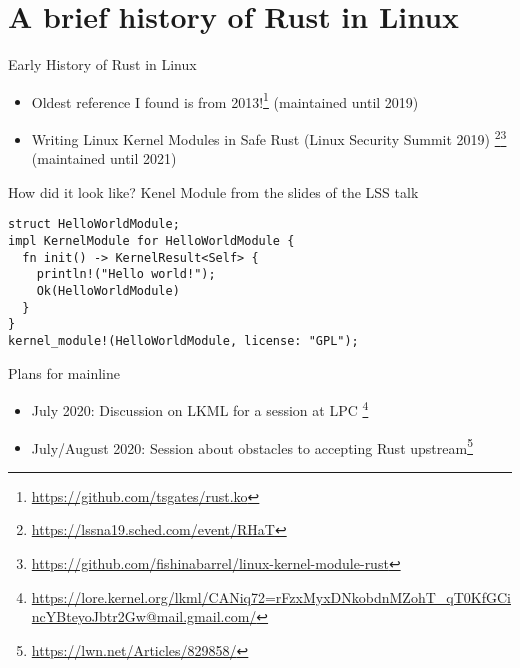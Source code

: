 \section{A brief history of Rust in Linux}

\begin{frame}[c]{Early History of Rust in Linux}
 \begin{itemize}
   \item Oldest reference I found is from 2013!\footnote{\url{https://github.com/tsgates/rust.ko}}
     {\small (maintained until 2019)}
   \pause\item Writing Linux Kernel Modules in Safe Rust (Linux Security Summit 2019)
     \footnote{\url{https://lssna19.sched.com/event/RHaT}}\footnote{\url{https://github.com/fishinabarrel/linux-kernel-module-rust}}
     {\small (maintained until 2021)}
 \end{itemize}
\end{frame}

\begin{frame}[c,fragile]{How did it look like?}
  Kenel Module from the slides of the LSS talk
  \begin{verbatim}
struct HelloWorldModule;
impl KernelModule for HelloWorldModule {
  fn init() -> KernelResult<Self> {
    println!("Hello world!");
    Ok(HelloWorldModule)
  }
}
kernel_module!(HelloWorldModule, license: "GPL");
  \end{verbatim}
\end{frame}

\begin{frame}[c]{Plans for mainline}
  \begin{itemize}
    \item July 2020: Discussion on LKML for a session at LPC
      \footnote{\url{https://lore.kernel.org/lkml/CANiq72=rFzxMyxDNkobdnMZohT_qT0KfGCincYBteyoJbtr2Gw@mail.gmail.com/}}
    \item July/August 2020: Session about obstacles to accepting Rust
      upstream\footnote{\url{https://lwn.net/Articles/829858/}}
  \end{itemize}
\end{frame}

